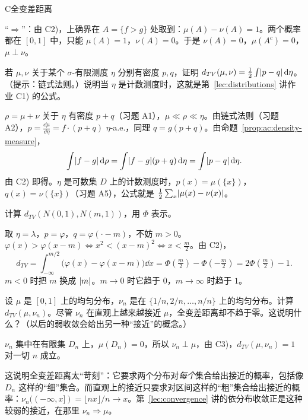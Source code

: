 \begin{probleme}{C}{全变差距离}
\begin{questions}
\begin{solution}
“$\Rightarrow$”：由 C2)，上确界在 $A=\{f>g\}$ 处取到：$\mu(A)-\nu(A)=1$。两个概率都在 $[0,1]$ 中，只能 $\mu(A)=1$，$\nu(A)=0$。于是 $\nu(A)=0$，$\mu(A^c)=0$，$\mu\perp\nu$。
\end{solution}
\item 若 $\mu,\nu$ 关于某个 $\sigma$-有限测度 $\eta$ 分别有密度 $p,q$，证明 $d_{TV}(\mu,\nu)=\frac12\int\lvert p-q\rvert\,\mathrm{d}\eta$。（提示：链式法则。）说明当 $\eta$ 是计数测度时，这就是第~\ref{lec:distributions} 讲作业 C1) 的公式。
\begin{solution}
$\rho=\mu+\nu$ 关于 $\eta$ 有密度 $p+q$（习题 A1），$\mu\ll\rho\ll\eta$。由链式法则（习题 A2），$p=\frac{\dd\mu}{\dd\eta}=f\cdot(p+q)$ $\eta$-a.e.，同理 $q=g(p+q)$。由命题~\ref{prop:ac:density-measure}，
\[
\int\lvert f-g\rvert\,\mathrm{d}\rho=\int\lvert f-g\rvert(p+q)\,\mathrm{d}\eta=\int\lvert p-q\rvert\,\mathrm{d}\eta .
\]
由 C2) 即得。$\eta$ 是可数集 $D$ 上的计数测度时，$p(x)=\mu(\{x\})$，$q(x)=\nu(\{x\})$（习题 A5），公式就是 $\frac12\sum_x\lvert \mu(x)-\nu(x)\rvert$。
\end{solution}
\item 计算 $d_{TV}(N(0,1),N(m,1))$，用 $\Phi$ 表示。
\begin{solution}
取 $\eta=\lambda$，$p=\varphi$，$q=\varphi(\cdot-m)$，不妨 $m>0$。$\varphi(x)>\varphi(x-m)\iff x^2<(x-m)^2\iff x<\frac m2$。由 C2)，
\[
d_{TV}=\int_{-\infty}^{m/2}\bigl(\varphi(x)-\varphi(x-m)\bigr)\dd x=\Phi(\tfrac m2)-\Phi(-\tfrac m2)=2\Phi(\tfrac m2)-1 .
\]
$m<0$ 时把 $m$ 换成 $\lvert m\rvert$。$m\to0$ 时它趋于 $0$，$m\to\infty$ 时趋于 $1$。
\end{solution}
\item 设 $\mu$ 是 $[0,1]$ 上的均匀分布，$\nu_n$ 是在 $\{1/n,2/n,\dots,n/n\}$ 上的均匀分布。计算 $d_{TV}(\mu,\nu_n)$。尽管 $\nu_n$ 在直观上越来越接近 $\mu$，全变差距离却不趋于零。这说明什么？（以后的弱收敛会给出另一种“接近”的概念。）
\begin{solution}
$\nu_n$ 集中在有限集 $D_n$ 上，$\mu(D_n)=0$，所以 $\nu_n\perp\mu$，由 C3)，$d_{TV}(\mu,\nu_n)=1$ 对一切 $n$ 成立。

这说明全变差距离太“苛刻”：它要求两个分布对\emph{每个}集合给出接近的概率，包括像 $D_n$ 这样的“细”集合。而直观上的接近只要求对区间这样的“粗”集合给出接近的概率：$\nu_n((-\infty,x])=\lfloor nx\rfloor/n\to x$。第~\ref{lec:convergence} 讲的依分布收敛正是这种较弱的接近，在那里 $\nu_n\Rightarrow\mu$。
\end{solution}
\end{questions}
\end{probleme}

\thinkingpart

